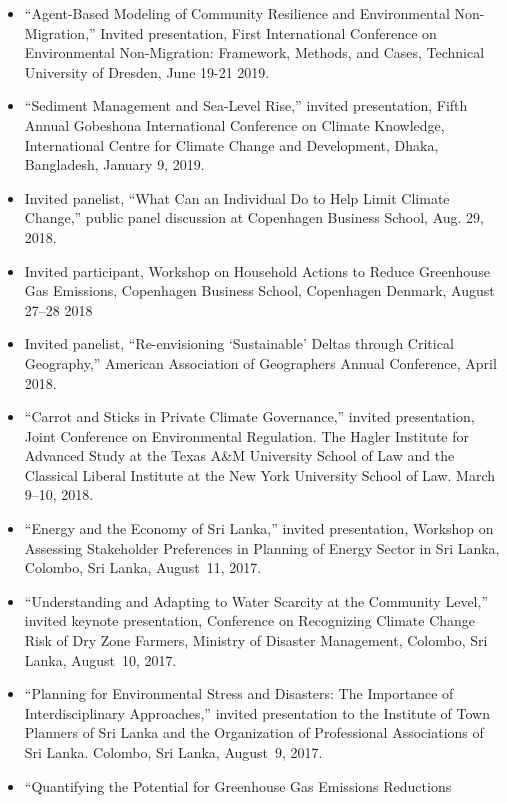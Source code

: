\documentclass[10pt]{article}
\begin{document}
\begin{itemize}
\item ``Agent-Based Modeling of Community Resilience and Environmental
Non-Migration,'' Invited presentation, First International Conference on
Environmental Non-Migration: Framework, Methods, and Cases, Technical
University of Dresden, June 19-21 2019.
\item ``Sediment Management and Sea-Level Rise,'' invited presentation, Fifth
Annual Gobeshona International Conference on Climate Knowledge, International
Centre for Climate Change and Development, Dhaka, Bangladesh, January 9, 2019.
\item Invited panelist, ``What Can an Individual Do to Help Limit Climate
Change,'' public panel discussion at Copenhagen Business School, Aug. 29,
2018.
\item Invited participant, Workshop on Household Actions to Reduce Greenhouse
Gas Emissions, Copenhagen Business School, Copenhagen Denmark, August 27--28
2018
\item Invited panelist, ``Re-envisioning `Sustainable' Deltas through Critical
Geography,'' American Association of Geographers Annual Conference, April
2018.
\item ``Carrot and Sticks in Private Climate Governance,'' invited
presentation, Joint Conference on Environmental Regulation. The Hagler
Institute for Advanced Study at the Texas A\&M University School of Law and
the Classical Liberal Institute at the New York University School of Law.
March 9--10, 2018.
\item ``Energy and the Economy of Sri Lanka,'' invited presentation, Workshop
on Assessing Stakeholder Preferences in Planning of Energy Sector in Sri
Lanka, Colombo, Sri Lanka, August~11, 2017.
\item ``Understanding and Adapting to Water Scarcity at the Community Level,''
invited keynote presentation, Conference on Recognizing Climate Change Risk
of Dry Zone Farmers, Ministry of Disaster Management, Colombo, Sri Lanka,
August~10, 2017.
\item ``Planning for Environmental Stress and Disasters: The Importance of
Interdisciplinary Approaches,'' invited presentation to the Institute of Town
Planners of Sri Lanka and the Organization of Professional Associations of
Sri Lanka. Colombo, Sri Lanka, August~9, 2017.
\item ``Quantifying the Potential for Greenhouse Gas Emissions Reductions

\end{itemize}
\end{document}
